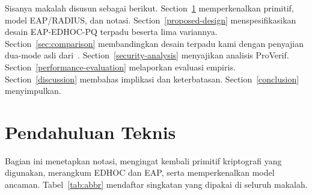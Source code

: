 \documentclass{easychair}
\begin{document}
Sisanya makalah disusun sebagai berikut.
Section~\ref{pleminary} memperkenalkan primitif, model EAP/RADIUS,
dan notasi. Section~\ref{proposed-design} menspesifikasikan desain
EAP-EDHOC-PQ terpadu beserta lima variannya.
Section~\ref{sec:comparison} membandingkan desain terpadu kami dengan
penyajian dua-mode asli dari~\cite{pq-edhoc-draft}.
Section~\ref{security-analysis} menyajikan analisis ProVerif.
Section~\ref{performance-evaluation} melaporkan evaluasi empiris.
Section~\ref{discussion} membahas implikasi dan keterbatasan.
Section~\ref{conclusion} menyimpulkan.


\section{Pendahuluan Teknis}
\label{pleminary}
Bagian ini menetapkan notasi, mengingat kembali primitif kriptografi
yang digunakan, merangkum EDHOC dan EAP, serta memperkenalkan model
ancaman. Tabel~\ref{tab:abbr} mendaftar singkatan yang dipakai di
seluruh makalah.
\end{document}
